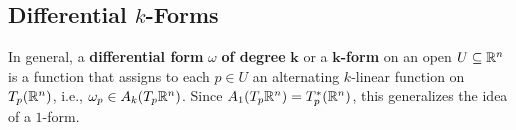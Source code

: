\subsection{Differential $k$-Forms}

In general, a \textbf{differential form} $\omega$ \textbf{of degree} $\mathbf k$ or a $\mathbf k$\textbf{-form} on an open $U\subseteq \mathbb{R}^n $ is a function that assigns to each $p \in U$ an alternating $k$-linear function on $T_p(\mathbb{R}^n )$, i.e., $\omega_p \in A_k(T_p\mathbb{R}^n )$. Since $A_1(T_p\mathbb{R}^n )=T_p^*(\mathbb{R}^n )$, this generalizes the idea of a $1$-form.
